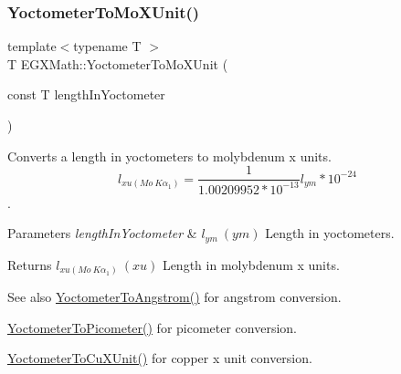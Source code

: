 \subsubsection{\texorpdfstring{Yoctometer\+To\+Mo\+X\+Unit()}{YoctometerToMoXUnit()}}
{\footnotesize\ttfamily template$<$typename T $>$ \\
T E\+G\+X\+Math\+::\+Yoctometer\+To\+Mo\+X\+Unit (\begin{DoxyParamCaption}\item[{const T}]{length\+In\+Yoctometer }\end{DoxyParamCaption})}



Converts a length in yoctometers to molybdenum x units. \[ l_{xu(Mo\ K\alpha_1)}=\frac{1}{1.00209952*10^{-13}} l_{ym} * 10^{-24}\]. 


\begin{DoxyParams}{Parameters}
{\em length\+In\+Yoctometer} & $ l_{ym}\ (ym)$ Length in yoctometers. \\
\hline
\end{DoxyParams}
\begin{DoxyReturn}{Returns}
$ l_{xu(Mo\ K\alpha_1)}\ (xu)$ Length in molybdenum x units. 
\end{DoxyReturn}
\begin{DoxySeeAlso}{See also}
\mbox{\hyperlink{group___e_g_x_math-_conversions-_length_conversions-_s_i-_yoctometer-_non-_s_i_ga1189896c419175e90e23cea9d8f6b52a}{Yoctometer\+To\+Angstrom()}} for angstrom conversion. 

\mbox{\hyperlink{group___e_g_x_math-_conversions-_length_conversions-_s_i-_yoctometer-_s_i_gab621b78b78d6776131912bd6038901b9}{Yoctometer\+To\+Picometer()}} for picometer conversion. 

\mbox{\hyperlink{group___e_g_x_math-_conversions-_length_conversions-_s_i-_yoctometer-_non-_s_i_ga0266faf325ea86fef13391fb6e792ff8}{Yoctometer\+To\+Cu\+X\+Unit()}} for copper x unit conversion. 
\end{DoxySeeAlso}
